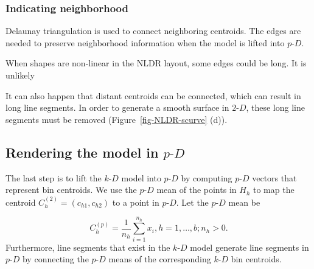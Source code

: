 \documentclass[
  12pt]{article}
\newcommand\pD{$p\text{-}D$}
\newcommand\kD{$k\text{-}D$}
\newcommand\gD{$2\text{-}D$}
\begin{document}
\subsubsection{Indicating neighborhood}\label{indicating-neighborhood}

Delaunay triangulation \citep{lee1980, alb2024} is used to connect
neighboring centroids. The edges are needed to preserve neighborhood
information when the model is lifted into \pD{}.

When shapes are non-linear in the NLDR layout, some edges could be long.
It is unlikely

It can also happen that distant centroids can be connected, which can
result in long line segments. In order to generate a smooth surface in
\gD{}, these long line segments must be removed
(Figure~\ref{fig-NLDR-scurve} (d)).

\subsection{\texorpdfstring{Rendering the model in
\pD{}}{Rendering the model in }}\label{rendering-the-model-in}

The last step is to lift the \kD{} model into \pD{} by computing \pD{}
vectors that represent bin centroids. We use the \pD{} mean of the
points in \(H_h\) to map the centroid \(C_{h}^{(2)} = (c_{h1}, c_{h2})\)
to a point in \pD{}. Let the \pD{} mean be

\[C_{h}^{(p)} = \frac{1}{n_h}\sum_{i =1}^{n_h} x_i, h = {1, \dots, b; n_h > 0}.\]
Furthermore, line segments that exist in the \kD{} model generate line
segments in \pD{} by connecting the \pD{} means of the corresponding
\kD{} bin centroids.
\end{document}
